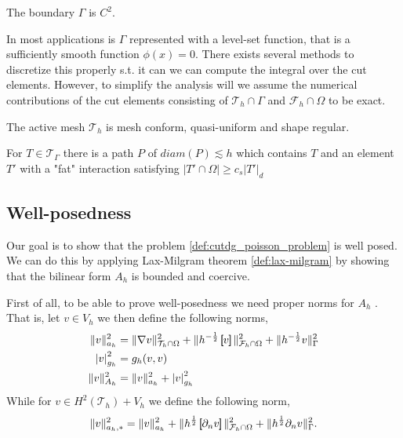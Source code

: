 \begin{assumption}[G1]
    \label{as:G1}
    The boundary $\Gamma $ is $C^{2}$.
\end{assumption}

\begin{remark}
In most applications is $\Gamma $ represented with a level-set function, that is a sufficiently smooth function $\phi ( x)  = 0$. There exists several methods to discretize this properly s.t. it can we can compute the integral over the cut elements.
    However, to simplify the analysis will we assume the numerical contributions of the cut elements consisting of $\mathcal{T}_{h} \cap \Gamma   $ and $\mathcal{F}_{h} \cap \Omega  $ to be exact.
\end{remark}


\begin{assumption}[G1]
   The active mesh $\mathcal{T}_{h} $ is mesh conform, quasi-uniform and shape regular.
\end{assumption}

\begin{assumption}[G3]
    For $T \in \mathcal{T} _{\Gamma   }$ there is a path $P$ of $diam(P) \lesssim h$ which contains $T$ and an element $T'$ with a "fat" interaction satisfying $\left\lvert T' \cap \Omega  \right\rvert \ge c_{s} \left\lvert T'  \right\rvert _{d}$
\end{assumption}


\subsection{Well-posedness}%
\label{sub:well_posedness}

Our goal is to show that the problem \ref{def:cutdg_poisson_problem} is well posed. We can do this by applying Lax-Milgram theorem \ref{def:lax-milgram} by showing that the bilinear form $A_{h}$ is bounded and coercive.

First of all, to be able to prove well-posedness we need proper norms for $A_{h}$ .
That is, let $v \in V_{h}$ we then define the following norms,
\[
\begin{split}
    \| v \|_{ a_{h} }^{ 2 }  & = \| \nabla v \|_{ \mathcal{T} _{h} \cap \Omega  }^{ 2 } + \| h^{-\frac{1}{2}} \left[\!\!\left[  v  \right]\!\!\right]   \|_{ \mathcal{F} _{h} \cap \Omega   }^2 + \| h^{-\frac{1}{2} } v \|_{ \Gamma  }^{ 2 }   \\
    \left\lvert v \right\rvert _{g_{h}}^{2} & = g_{h}( v,v)  \\
    \| v \|_{ A_{h} }^{ 2 } &= \| v \|_{ a_{h} }^{ 2 } + \left\lvert v \right\rvert_{g_{h}}^{2}     \\
\end{split}
\]
While for $v \in H^2( \mathcal{T} _{h}) + V_{h}$ we define the following norm,\[
\| v \|_{ a_{h},* }^{ 2 } = \| v \|_{ a_{h} }^{ 2 } +   \| h^{\frac{1}{2}} \left[\!\!\left[  \partial _{n} v  \right]\!\!\right]    \|_{  \mathcal{F} _{h} \cap \Omega }^{  2} + \| h^{\frac{1}{2}} \partial _{n} v \|_{ \Gamma  }^{ 2 }.
\]

